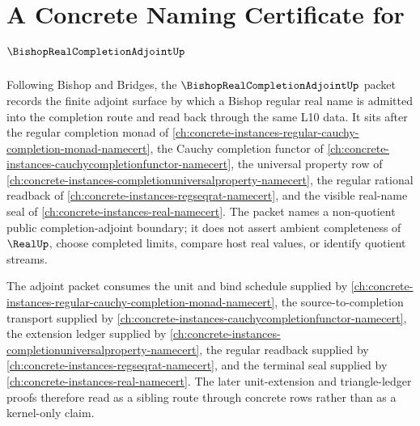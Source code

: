 \chapter{A Concrete Naming Certificate for $\BishopRealCompletionAdjointUp$}
\label{ch:concrete-instances-bishop-real-completion-adjoint-namecert}

Following Bishop and Bridges, the $\BishopRealCompletionAdjointUp$ packet records the finite adjoint surface by which a Bishop regular real name is admitted into the completion route and read back through the same L10 data. It sits after the regular completion monad of \autoref{ch:concrete-instances-regular-cauchy-completion-monad-namecert}, the Cauchy completion functor of \autoref{ch:concrete-instances-cauchycompletionfunctor-namecert}, the universal property row of \autoref{ch:concrete-instances-completionuniversalproperty-namecert}, the regular rational readback of \autoref{ch:concrete-instances-regseqrat-namecert}, and the visible real-name seal of \autoref{ch:concrete-instances-real-namecert}. The packet names a non-quotient public completion-adjoint boundary; it does not assert ambient completeness of $\RealUp$, choose completed limits, compare host real values, or identify quotient streams.

The adjoint packet consumes the unit and bind schedule supplied by \autoref{ch:concrete-instances-regular-cauchy-completion-monad-namecert}, the source-to-completion transport supplied by \autoref{ch:concrete-instances-cauchycompletionfunctor-namecert}, the extension ledger supplied by \autoref{ch:concrete-instances-completionuniversalproperty-namecert}, the regular readback supplied by \autoref{ch:concrete-instances-regseqrat-namecert}, and the terminal seal supplied by \autoref{ch:concrete-instances-real-namecert}. The later unit-extension and triangle-ledger proofs therefore read as a sibling route through concrete rows rather than as a kernel-only claim.

